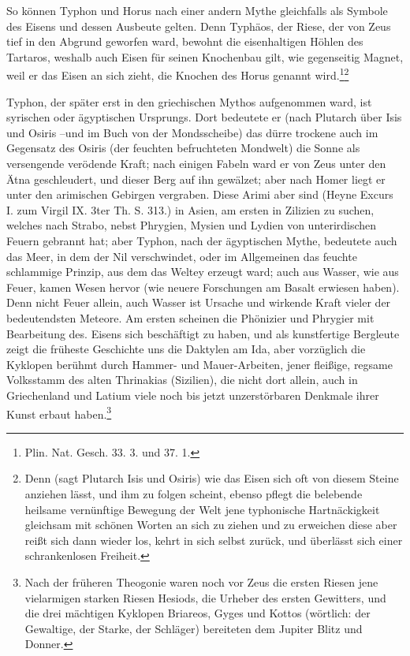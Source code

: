 \documentclass[a4paper, 11pt, oneside, polutonikogreek, german]{article}
\begin{document}
So können Typhon und Horus nach einer andern Mythe gleichfalls als Symbole des Eisens und dessen Ausbeute gelten. Denn Typhäos, der Riese, der von Zeus tief in den Abgrund geworfen ward, bewohnt die eisenhaltigen Höhlen des Tartaros, weshalb auch Eisen für seinen Knochenbau gilt, wie gegenseitig Magnet, weil er das Eisen an sich zieht, die Knochen des Horus genannt wird.\footnote{Plin. Nat. Gesch. 33. 3. und 37. 1.}\footnote{Denn (sagt Plutarch Isis und Osiris) wie das Eisen sich oft von diesem Steine anziehen lässt, und ihm zu folgen scheint, ebenso pflegt die belebende heilsame vernünftige Bewegung der Welt jene typhonische Hartnäckigkeit gleichsam mit schönen Worten an sich zu ziehen und zu erweichen diese aber reißt sich dann wieder los, kehrt in sich selbst zurück, und überlässt sich einer schrankenlosen Freiheit.}

Typhon, der später erst in den griechischen Mythos aufgenommen ward, ist syrischen oder ägyptischen Ursprungs. Dort bedeutete er (nach Plutarch über Isis und Osiris --und im Buch von der Mondsscheibe) das dürre trockene auch im Gegensatz des Osiris (der feuchten befruchteten Mondwelt) die Sonne als versengende verödende Kraft; nach einigen Fabeln ward er von Zeus unter den Ätna geschleudert, und dieser Berg auf ihn gewälzet; aber nach Homer liegt er unter den arimischen Gebirgen vergraben. Diese Arimi aber sind (Heyne Excurs I. zum Virgil IX. 3ter Th. S. 313.) in Asien, am ersten in Zilizien zu suchen, welches nach Strabo, nebst Phrygien, Mysien und Lydien von unterirdischen Feuern gebrannt hat; aber Typhon, nach der ägyptischen Mythe, bedeutete auch das Meer, in dem der Nil verschwindet, oder im Allgemeinen das feuchte schlammige Prinzip, aus dem das Weltey erzeugt ward; auch aus Wasser, wie aus Feuer, kamen Wesen hervor (wie neuere Forschungen am Basalt erwiesen haben). Denn nicht Feuer allein, auch Wasser ist Ursache und wirkende Kraft vieler der bedeutendsten Meteore. Am ersten scheinen die Phönizier und Phrygier mit Bearbeitung des. Eisens sich beschäftigt zu haben, und als kunstfertige Bergleute zeigt die früheste Geschichte uns die Daktylen am Ida, aber vorzüglich die Kyklopen berühmt durch Hammer- und Mauer-Arbeiten, jener fleißige, regsame Volksstamm des alten Thrinakias (Sizilien), die nicht dort allein, auch in Griechenland und Latium viele noch bis jetzt unzerstörbaren Denkmale ihrer Kunst erbaut haben.\footnote{Nach der früheren Theogonie waren noch vor Zeus die ersten Riesen jene vielarmigen starken Riesen Hesiods, die Urheber des ersten Gewitters, und die drei mächtigen Kyklopen Briareos, Gyges und Kottos (wörtlich: der Gewaltige, der Starke, der Schläger) bereiteten dem Jupiter Blitz und Donner.}
\end{document}
